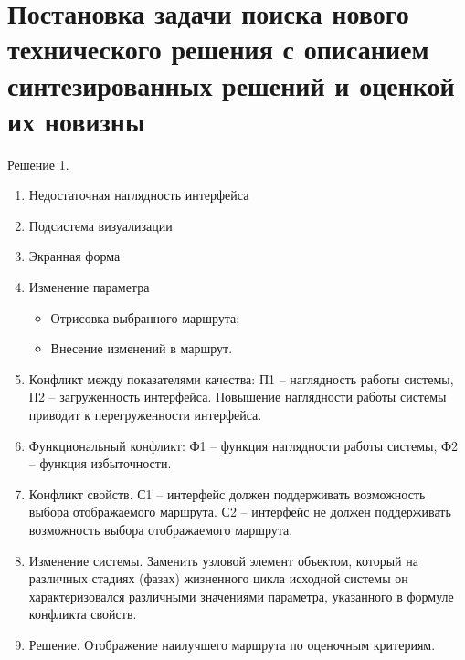 \chapter{Постановка задачи поиска нового технического решения с описанием синтезированных решений и 
    оценкой их новизны}
Решение 1.
\begin{enumerate}
    \item Недостаточная наглядность интерфейса
    \item Подсистема визуализации
    \item Экранная форма
    \item Изменение параметра
    \begin{itemize}
        \item Отрисовка выбранного маршрута;
        \item Внесение изменений в маршрут.
    \end{itemize}
    \item Конфликт между показателями качества: П1 -- наглядность работы системы, 
        П2 -- загруженность интерфейса. Повышение наглядности работы системы приводит к 
        перегруженности интерфейса.
    \item Функциональный конфликт: Ф1 -- функция наглядности работы системы, Ф2 -- 
        функция избыточности.
    \item Конфликт свойств. С1 -- интерфейс должен поддерживать возможность выбора отображаемого 
        маршрута. С2 -- интерфейс не должен поддерживать возможность выбора отображаемого маршрута.
    \item Изменение системы. Заменить узловой элемент объектом, который на различных стадиях (фазах) 
        жизненного цикла исходной системы он характеризовался различными значениями параметра, 
        указанного в формуле конфликта свойств.
    \item Решение. Отображение наилучшего маршрута по оценочным критериям.
\end{enumerate}

\pagebreak

